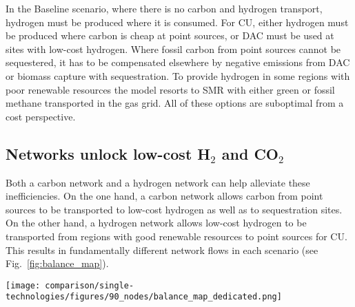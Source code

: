 \documentclass[twocolumn]{article}
\newcommand{\carbon}{CO$_2$}
\newcommand{\hydrogen}{H$_2$}
\newcommand{\carbongrid}{CO$_2$\=/Grid}
\newcommand{\baselinescenario}{Baseline scenario}
\newcommand{\hydrogenscenario}{H$_2$\=/Grid scenario}
\begin{document}
In the \baselinescenario{}, where there is no carbon and hydrogen transport, hydrogen must be produced where it is consumed. For CU, either hydrogen must be produced where carbon is cheap at point sources, or DAC must be used at sites with low-cost hydrogen. Where fossil carbon from point sources cannot be sequestered, it has to be compensated elsewhere by negative emissions from DAC or biomass capture with sequestration. To provide hydrogen in some regions with poor renewable resources the model resorts to SMR with either green or fossil methane transported in the gas grid. All of these options are suboptimal from a cost perspective.

\subsection*{Networks unlock low-cost \hydrogen{} and \carbon{}}

Both a carbon network and a hydrogen network can help alleviate these inefficiencies. On the one hand, a carbon network allows carbon from point sources to be transported to low-cost hydrogen as well as to sequestration sites. On the other hand, a hydrogen network allows low-cost hydrogen to be transported from regions with good renewable resources to point sources for CU. This results in fundamentally different network flows in each scenario (see Fig.~\ref{fig:balance_map}).


\begin{figure*}[ht!]
    \centering
    \texttt{[image: comparison/single-technologies/figures/90\_nodes/balance\_map\_dedicated.png]}
    \caption{Average production, consumption, flows and prices of the carbon (top line) and hydrogen (bottom line) sectors in the \carbongrid{} (left) and the \hydrogenscenario{} (right). For each region, upper semicircles show the average production per technology, lower semicircles the consumption, and colors the average marginal prices. Lines and arrows show the interregional transportation. Carbon sequestration offshore is drawn in full circles.
    }
    \label{fig:balance_map}
\end{figure*}
\end{document}
